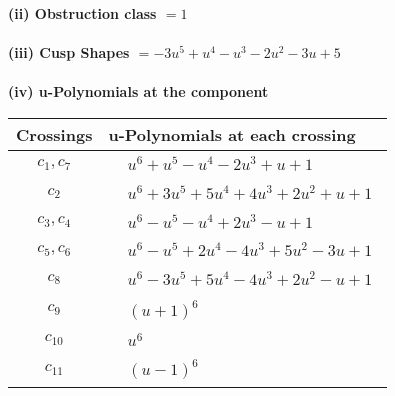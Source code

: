 \documentclass[1p]{elsarticle_modified}
\theoremstyle{definition}
\begin{document}
\flushleft \textbf{(ii) Obstruction class $= 1$}\\~\\
\flushleft \textbf{(iii) Cusp Shapes $= -3 u^5+u^4- u^3-2 u^2-3 u+5$}\\~\\
\newpage\renewcommand{\arraystretch}{1}
\flushleft \textbf{(iv) u-Polynomials at the component}\newline \\
\begin{tabular}{m{50pt}|m{274pt}}
Crossings & \hspace{64pt}u-Polynomials at each crossing \\
\hline $$\begin{aligned}c_{1},c_{7}\end{aligned}$$&$\begin{aligned}
&u^6+u^5- u^4-2 u^3+u+1
\end{aligned}$\\
\hline $$\begin{aligned}c_{2}\end{aligned}$$&$\begin{aligned}
&u^6+3 u^5+5 u^4+4 u^3+2 u^2+u+1
\end{aligned}$\\
\hline $$\begin{aligned}c_{3},c_{4}\end{aligned}$$&$\begin{aligned}
&u^6- u^5- u^4+2 u^3- u+1
\end{aligned}$\\
\hline $$\begin{aligned}c_{5},c_{6}\end{aligned}$$&$\begin{aligned}
&u^6- u^5+2 u^4-4 u^3+5 u^2-3 u+1
\end{aligned}$\\
\hline $$\begin{aligned}c_{8}\end{aligned}$$&$\begin{aligned}
&u^6-3 u^5+5 u^4-4 u^3+2 u^2- u+1
\end{aligned}$\\
\hline $$\begin{aligned}c_{9}\end{aligned}$$&$\begin{aligned}
&(u+1)^6
\end{aligned}$\\
\hline $$\begin{aligned}c_{10}\end{aligned}$$&$\begin{aligned}
&u^6
\end{aligned}$\\
\hline $$\begin{aligned}c_{11}\end{aligned}$$&$\begin{aligned}
&(u-1)^6
\end{aligned}$\\
\hline
\end{tabular}\\~\\
\end{document}
